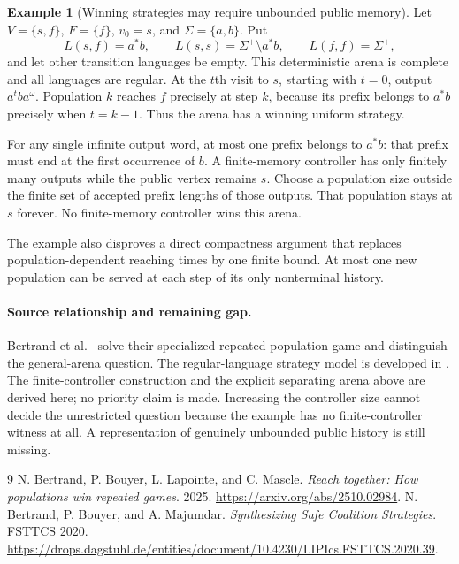 \documentclass[11pt]{article}
\theoremstyle{definition}
\newtheorem{example}{Example}
\theoremstyle{remark}
\begin{document}
\begin{example}[Winning strategies may require unbounded public memory]
Let $V=\{s,f\}$, $F=\{f\}$, $v_0=s$, and $\Sigma=\{a,b\}$. Put
\[
 L(s,f)=a^*b,\qquad L(s,s)=\Sigma^+\setminus a^*b,
 \qquad L(f,f)=\Sigma^+,
\]
and let other transition languages be empty. This deterministic arena is complete and all languages are regular. At the $t$th visit to $s$, starting with $t=0$, output $a^tba^\omega$. Population $k$ reaches $f$ precisely at step $k$, because its prefix belongs to $a^*b$ precisely when $t=k-1$. Thus the arena has a winning uniform strategy.

For any single infinite output word, at most one prefix belongs to $a^*b$: that prefix must end at the first occurrence of $b$. A finite-memory controller has only finitely many outputs while the public vertex remains $s$. Choose a population size outside the finite set of accepted prefix lengths of those outputs. That population stays at $s$ forever. No finite-memory controller wins this arena.
\end{example}

The example also disproves a direct compactness argument that replaces population-dependent reaching times by one finite bound. At most one new population can be served at each step of its only nonterminal history.

\paragraph{Source relationship and remaining gap.}
Bertrand et al.~\cite{reach} solve their specialized repeated population game and distinguish the general-arena question. The regular-language strategy model is developed in \cite{safe}. The finite-controller construction and the explicit separating arena above are derived here; no priority claim is made. Increasing the controller size cannot decide the unrestricted question because the example has no finite-controller witness at all. A representation of genuinely unbounded public history is still missing.

\begin{thebibliography}{9}
 N. Bertrand, P. Bouyer, L. Lapointe, and C. Mascle.
\emph{Reach together: How populations win repeated games}. 2025.
\url{https://arxiv.org/abs/2510.02984}.
 N. Bertrand, P. Bouyer, and A. Majumdar.
\emph{Synthesizing Safe Coalition Strategies}. FSTTCS 2020.
\url{https://drops.dagstuhl.de/entities/document/10.4230/LIPIcs.FSTTCS.2020.39}.
\end{thebibliography}
\end{document}
